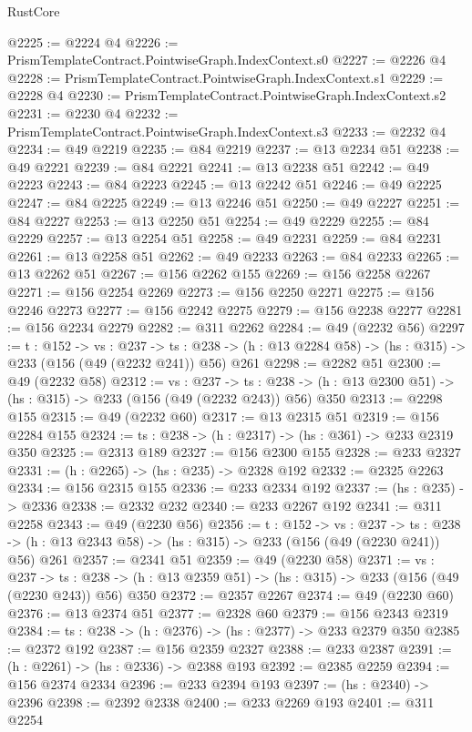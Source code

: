 \begin{lexlean}{RustCore}
\begin{coremodule}
@2225 := @2224 @4
@2226 := PrismTemplateContract.PointwiseGraph.IndexContext.s0
@2227 := @2226 @4
@2228 := PrismTemplateContract.PointwiseGraph.IndexContext.s1
@2229 := @2228 @4
@2230 := PrismTemplateContract.PointwiseGraph.IndexContext.s2
@2231 := @2230 @4
@2232 := PrismTemplateContract.PointwiseGraph.IndexContext.s3
@2233 := @2232 @4
@2234 := @49 @2219
@2235 := @84 @2219
@2237 := @13 @2234 @51
@2238 := @49 @2221
@2239 := @84 @2221
@2241 := @13 @2238 @51
@2242 := @49 @2223
@2243 := @84 @2223
@2245 := @13 @2242 @51
@2246 := @49 @2225
@2247 := @84 @2225
@2249 := @13 @2246 @51
@2250 := @49 @2227
@2251 := @84 @2227
@2253 := @13 @2250 @51
@2254 := @49 @2229
@2255 := @84 @2229
@2257 := @13 @2254 @51
@2258 := @49 @2231
@2259 := @84 @2231
@2261 := @13 @2258 @51
@2262 := @49 @2233
@2263 := @84 @2233
@2265 := @13 @2262 @51
@2267 := @156 @2262 @155
@2269 := @156 @2258 @2267
@2271 := @156 @2254 @2269
@2273 := @156 @2250 @2271
@2275 := @156 @2246 @2273
@2277 := @156 @2242 @2275
@2279 := @156 @2238 @2277
@2281 := @156 @2234 @2279
@2282 := @311 @2262
@2284 := @49 (@2232 @56)
@2297 := {t : @152} ->
  {vs : @237} ->
  {ts : @238} -> (h : @13 @2284 @58) -> (hs : @315) -> @233 (@156 (@49 (@2232 @241)) @56) @261
@2298 := @2282 @51
@2300 := @49 (@2232 @58)
@2312 := {vs : @237} ->
  {ts : @238} -> (h : @13 @2300 @51) -> (hs : @315) -> @233 (@156 (@49 (@2232 @243)) @56) @350
@2313 := @2298 @155
@2315 := @49 (@2232 @60)
@2317 := @13 @2315 @51
@2319 := @156 @2284 @155
@2324 := {ts : @238} -> (h : @2317) -> (hs : @361) -> @233 @2319 @350
@2325 := @2313 @189
@2327 := @156 @2300 @155
@2328 := @233 @2327
@2331 := (h : @2265) -> (hs : @235) -> @2328 @192
@2332 := @2325 @2263
@2334 := @156 @2315 @155
@2336 := @233 @2334 @192
@2337 := (hs : @235) -> @2336
@2338 := @2332 @232
@2340 := @233 @2267 @192
@2341 := @311 @2258
@2343 := @49 (@2230 @56)
@2356 := {t : @152} ->
  {vs : @237} ->
  {ts : @238} -> (h : @13 @2343 @58) -> (hs : @315) -> @233 (@156 (@49 (@2230 @241)) @56) @261
@2357 := @2341 @51
@2359 := @49 (@2230 @58)
@2371 := {vs : @237} ->
  {ts : @238} -> (h : @13 @2359 @51) -> (hs : @315) -> @233 (@156 (@49 (@2230 @243)) @56) @350
@2372 := @2357 @2267
@2374 := @49 (@2230 @60)
@2376 := @13 @2374 @51
@2377 := @2328 @60
@2379 := @156 @2343 @2319
@2384 := {ts : @238} -> (h : @2376) -> (hs : @2377) -> @233 @2379 @350
@2385 := @2372 @192
@2387 := @156 @2359 @2327
@2388 := @233 @2387
@2391 := (h : @2261) -> (hs : @2336) -> @2388 @193
@2392 := @2385 @2259
@2394 := @156 @2374 @2334
@2396 := @233 @2394 @193
@2397 := (hs : @2340) -> @2396
@2398 := @2392 @2338
@2400 := @233 @2269 @193
@2401 := @311 @2254

\end{coremodule}
\end{lexlean}
